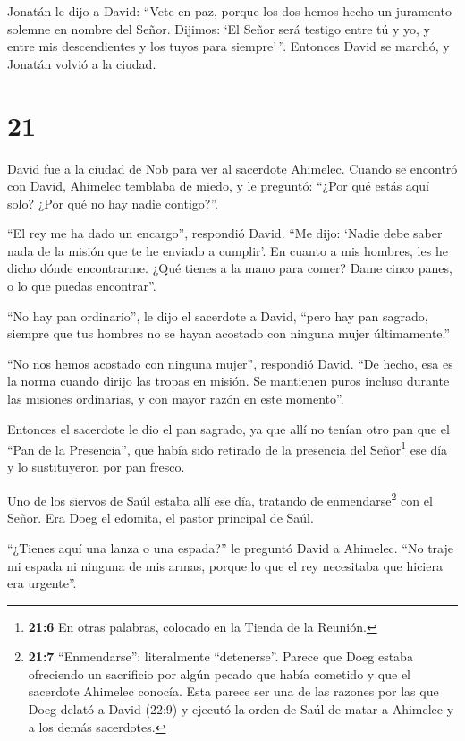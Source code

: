  Jonatán le dijo a David: ``Vete en paz, porque los dos
hemos hecho un juramento solemne en nombre del Señor. Dijimos: `El Señor
será testigo entre tú y yo, y entre mis descendientes y los tuyos para
siempre'\,''. Entonces David se marchó, y Jonatán volvió a la ciudad.

\hypertarget{section-20}{%
\section{21}\label{section-20}}

 David fue a la ciudad de Nob para ver al sacerdote
Ahimelec. Cuando se encontró con David, Ahimelec temblaba de miedo, y le
preguntó: ``¿Por qué estás aquí solo? ¿Por qué no hay nadie contigo?''.

 ``El rey me ha dado un encargo'', respondió David. ``Me
dijo: `Nadie debe saber nada de la misión que te he enviado a cumplir'.
En cuanto a mis hombres, les he dicho dónde encontrarme. 
¿Qué tienes a la mano para comer? Dame cinco panes, o lo que puedas
encontrar''.

 ``No hay pan ordinario'', le dijo el sacerdote a David,
``pero hay pan sagrado, siempre que tus hombres no se hayan acostado con
ninguna mujer últimamente.''

 ``No nos hemos acostado con ninguna mujer'', respondió
David. ``De hecho, esa es la norma cuando dirijo las tropas en misión.
Se mantienen puros incluso durante las misiones ordinarias, y con mayor
razón en este momento''.

 Entonces el sacerdote le dio el pan sagrado, ya que allí no
tenían otro pan que el ``Pan de la Presencia'', que había sido retirado
de la presencia del Señor\footnote{\textbf{21:6} En otras palabras,
  colocado en la Tienda de la Reunión.} ese día y lo sustituyeron por
pan fresco.

 Uno de los siervos de Saúl estaba allí ese día, tratando de
enmendarse\footnote{\textbf{21:7} ``Enmendarse'': literalmente
  ``detenerse''. Parece que Doeg estaba ofreciendo un sacrificio por
  algún pecado que había cometido y que el sacerdote Ahimelec conocía.
  Esta parece ser una de las razones por las que Doeg delató a David
  (22:9) y ejecutó la orden de Saúl de matar a Ahimelec y a los demás
  sacerdotes.} con el Señor. Era Doeg el edomita, el pastor principal de
Saúl.

 ``¿Tienes aquí una lanza o una espada?'' le preguntó David
a Ahimelec. ``No traje mi espada ni ninguna de mis armas, porque lo que
el rey necesitaba que hiciera era urgente''.

